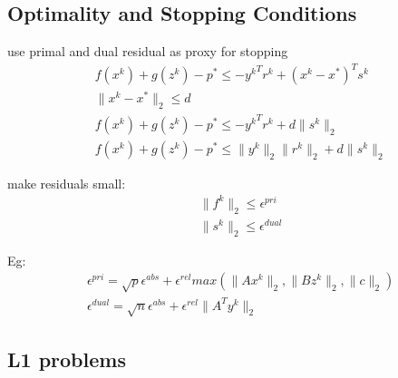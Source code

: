 \message{ !name(notebook.tex)}\documentclass[8pt]{report}
\newcommand{\norm}[1]{\|#1\|}
\begin{document}
\begin{multicols*}{2}
\subsection{Optimality and Stopping Conditions}
  use primal and dual residual as proxy for stopping\\
  \begin{align*}
    &f(x^k)+g(z^k)-p^* \leq -{y^k}^T r^k + (x^k-x^*)^T s^k\\
    &\norm{x^k-x^*}_2 \leq d\\
    &f(x^k)+g(z^k)-p^* \leq -{y^k}^T r^k + d \norm{s^k}_2\\
    &f(x^k)+g(z^k)-p^* \leq \norm{y^k}_2 \norm{r^k}_2 + d \norm{s^k}_2
  \end{align*}

  make residuals small:
  \begin{align*}
    &\norm{f^k}_2 \leq \epsilon^{pri}\\
    &\norm{s^k}_2 \leq \epsilon^{dual}
  \end{align*}

  Eg:
  \begin{align*}
    &\epsilon^{pri}=\sqrt{p} \epsilon^{abs} + \epsilon^{rel} max(\norm{Ax^k}_2, \norm{Bz^k}_2, \norm{c}_2)\\
    &\epsilon^{dual}=\sqrt{n} \epsilon^{abs} + \epsilon^{rel} \norm{A^T y^k}_2
  \end{align*}
    
  \vfill\null
  \columnbreak

  \subsection{L1 problems}
  

\end{multicols*}
\end{document}
